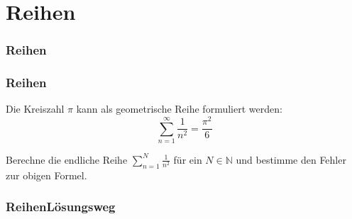 \def\stitle{Reihen}
\section{\stitle}
\begin{frame}
  \frametitle{\stitle}%
\tableofcontents[current]
\end{frame}

\begin{frame}[t]%
    \frametitle{\stitle}

Die Kreiszahl $\pi$ kann als geometrische Reihe formuliert werden:
$$
\sum_{n=1}^\infty  \frac{1}{n^2} = \frac{\pi^2}{6}
$$

Berechne die endliche Reihe $\sum_{n=1}^N \frac{1}{n^2}$ für ein $N\in\mathbb{N}$ und bestimme den Fehler zur obigen Formel.

\pause

\end{frame}


\begin{frame}[fragile]%
 \frametitle{\stitle Lösungsweg}%

\end{frame}

